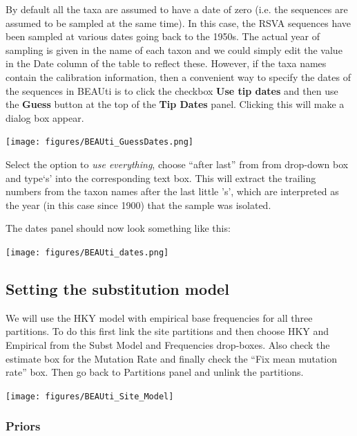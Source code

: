 \documentclass[12pt]{article}
\begin{document}
By default all the taxa are assumed to have a date of zero (i.e. the sequences are assumed to be sampled at the same time).
In this case, the RSVA sequences have been sampled at various dates going back to the 1950s. The actual year of sampling
is given in the name of each taxon and we could simply edit the value in the Date column of the table to reflect these.
However, if the taxa names contain the calibration information, then a convenient way to specify the dates of the sequences
in BEAUti is to click the checkbox {\bf Use tip dates} and then use the {\bf Guess} button at the top of the {\bf Tip Dates} panel. Clicking this will make a dialog box appear.

\medskip{}

\begin{center}
\texttt{[image: figures/BEAUti\_GuessDates.png]}%
\end{center}

\medskip{}

Select the option to {\it use everything}, choose ``after last'' from from drop-down box and type`s' into the corresponding text box. This will extract the trailing numbers from the taxon names after the last little 's', which are interpreted as the year (in this case since 1900) that the sample was isolated.

The dates panel should now look something like this:

\begin{center}
\texttt{[image: figures/BEAUti\_dates.png]}%
\end{center}


\subsection*{Setting the substitution model}
We will use the HKY model with empirical base frequencies for all three partitions. To do this first link the site partitions and then choose HKY and Empirical from the Subst Model and Frequencies drop-boxes. Also check the estimate box for the Mutation Rate and finally check the ``Fix mean mutation rate'' box. Then go back to Partitions panel and unlink the partitions.

\medskip{}

\texttt{[image: figures/BEAUti\_Site\_Model]}%

\medskip{}

\subsubsection{Priors }
\end{document}
